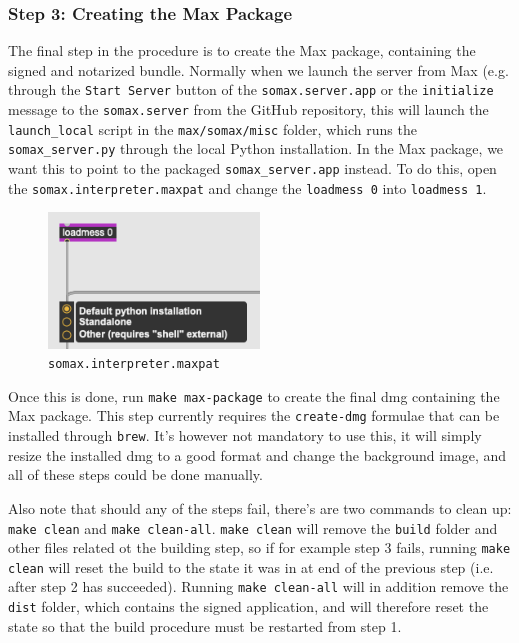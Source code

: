 \subsubsection{Step 3: Creating the Max Package}
The final step in the procedure is to create the Max package, containing the signed and notarized bundle. Normally when we launch the server from Max (e.g. through the \texttt{Start Server} button of the \texttt{somax.server.app} or the \texttt{initialize} message to the \texttt{somax.server} from the GitHub repository, this will launch the \texttt{launch\_local} script in the \texttt{max/somax/misc} folder, which runs the \texttt{somax\_server.py} through the local Python installation. In the Max package, we want this to point to the packaged \texttt{somax\_server.app} instead. To do this, open the \texttt{somax.interpreter.maxpat} and change the \texttt{loadmess 0} into \texttt{loadmess 1}.

\begin{figure}[h!]
    \centering        
 	\includegraphics[width=0.5\textwidth, keepaspectratio]{figures/somax_interpreter.png}
    \caption{\texttt{somax.interpreter.maxpat}}
    \label{fig:myFig}
\end{figure}

Once this is done, run \texttt{make max-package} to create the final dmg containing the Max package. This step currently requires the \texttt{create-dmg} formulae that can be installed through \texttt{brew}. It's however not mandatory to use this, it will simply resize the installed dmg to a good format and change the background image, and all of these steps could be done manually.

Also note that should any of the steps fail, there's are two commands to clean up: \texttt{make clean} and \texttt{make clean-all}. \texttt{make clean} will remove the \texttt{build} folder and other files related ot the building step, so if for example step 3 fails, running \texttt{make clean} will reset the build to the state it was in at end of the previous step (i.e. after step 2 has succeeded). Running \texttt{make clean-all} will in addition remove the \texttt{dist} folder, which contains the signed application, and will therefore reset the state so that the build procedure must be restarted from step 1.

